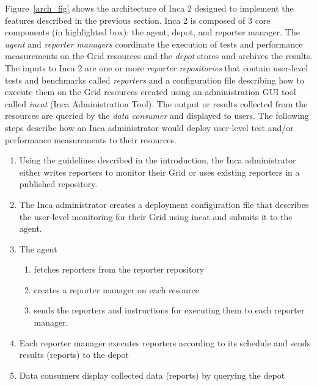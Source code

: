 \documentclass[times,10pt,twocolumn]{article}
\begin{document}
Figure~\ref{arch_fig} shows the architecture of Inca 2 designed to implement
the features described in the previous section.  Inca 2 is composed of 3 core
components (in highlighted box):  the agent, depot, and reporter manager.
The \textit{agent} and \textit{reporter managers} coordinate the execution of
tests and performance measurements on the Grid resources and the
\textit{depot} stores and archives the results.  The inputs to Inca 2 are one
or more \textit{reporter repositories} that contain user-level tests and
benchmarks called \textit{reporters} and a configuration file describing how
to execute them on the Grid resources created using an administration GUI tool
called \textit{incat} (Inca Administration Tool).  The output or results
collected from the resources are queried by the \textit{data consumer} and
displayed to users.  The following steps describe how an Inca administrator
would deploy user-level test and/or performance measurements to their
resources.

\begin{enumerate}

\item Using the guidelines described in the introduction, the Inca
administrator either writes reporters to monitor their Grid or uses existing
reporters in a published repository.

\item The Inca administrator creates a deployment configuration file that
describes the user-level monitoring for their Grid using incat and submits it
to the agent.

\item The agent
  \begin{enumerate}
    \item fetches reporters from the reporter repository
    \item creates a reporter manager on each resource
    \item sends the reporters and instructions for executing them to each reporter manager.
  \end{enumerate}

\item Each reporter manager executes reporters according to its schedule and
sends results (reports) to the depot

\item Data consumers display collected data (reports) by querying the depot
\end{enumerate}
\end{document}
